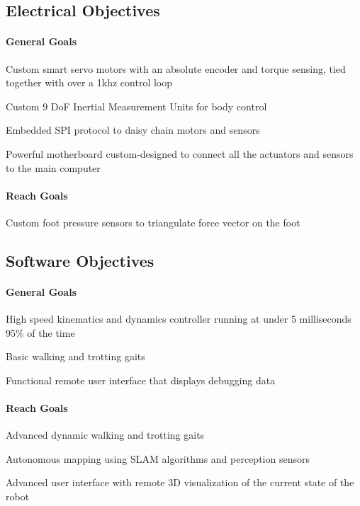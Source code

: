 \subsection*{Electrical Objectives}
\paragraph*{General Goals}
\begin{Deliverables}
    \item Custom smart servo motors with an absolute encoder and torque sensing, tied together with over a 1khz control loop 
    \item Custom 9 DoF Inertial Measurement Units for body control
    \item Embedded SPI protocol to daisy chain motors and sensors
    \item Powerful motherboard custom-designed to connect all the actuators and sensors to the main computer
\end{Deliverables}
\paragraph*{Reach Goals}
\begin{Deliverables}
    \item Custom foot pressure sensors to triangulate force vector on the foot
\end{Deliverables}

\subsection*{Software Objectives}
\paragraph*{General Goals}
\begin{Deliverables}
    \item High speed kinematics and dynamics controller running at under 5 milliseconds 95\% of the time
    \item Basic walking and trotting gaits
    \item Functional remote user interface that displays debugging data
\end{Deliverables}
\paragraph*{Reach Goals}
\begin{Deliverables}
    \item Advanced dynamic walking and trotting gaits
    \item Autonomous mapping using SLAM algorithms and perception sensors
    \item Advanced user interface with remote 3D visualization of the current state of the robot
\end{Deliverables}

